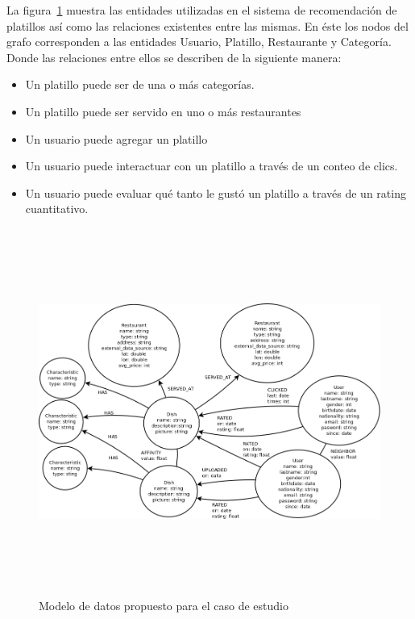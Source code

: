       La figura~\ref{fig:data model} muestra las entidades utilizadas en el sistema de recomendación de platillos así como las relaciones existentes entre las mismas. En éste los nodos del grafo corresponden a las entidades Usuario, Platillo, Restaurante y Categoría. Donde las relaciones entre ellos se describen de la siguiente manera: 
      \begin{itemize}
        \item Un platillo puede ser de una o más categorías.
        \item Un platillo puede ser servido en uno o más restaurantes
        \item Un usuario puede agregar un platillo
        \item Un usuario puede interactuar con un platillo a través de un conteo de clics.
        \item Un usuario puede evaluar qué tanto le gustó un platillo a través de un rating cuantitativo.
      \end{itemize} 

      \begin{landscape}
        \begin{figure}[h!]
          \centering
          \includegraphics[width=22.5cm,height=12cm]{./images/sc_data_model.png}
          \caption{Modelo de datos propuesto para el caso de estudio}
          \label{fig:data model}
        \end{figure}
      \end{landscape}


